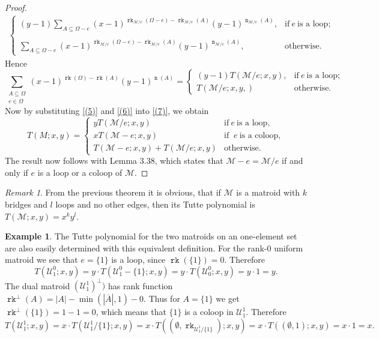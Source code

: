 \documentclass[12pt,a4paper, twoside, autooneside=false]{scrartcl}
\theoremstyle{definition}
\newtheorem{beispiel}[theorem]{Example}
\theoremstyle{remark}
\newtheorem{remark}[theorem]{Remark}
\numberwithin{equation}{section}
\DeclareMathOperator{\rk}{\mathtt{rk}}
\DeclareMathOperator{\n}{\mathtt{n}}
\newcommand{\M}{\mathcal{M}} %
\begin{document}
\begin{proof}
\begin{align*}
\begin{cases}
(y - 1) \sum\limits_{A \subseteq \Omega - e} (x - 1)^{\rk_{\M / e}(\Omega - e) - \rk_{\M / e}(A)} (y - 1)^{\n_{\M / e}(A)}, & \text{if} \ e \ \text{is a loop}; \\
& \\ 
\sum\limits_{A \subseteq \Omega - e} (x - 1)^{\rk_{\M / e }(\Omega - e) - \rk_{\M / e}(A)} (y - 1)^{\n_{\M / e}(A)}, & \text{otherwise}.
\end{cases}
\end{align*}
Hence 
\begin{equation} \label{(6)} 
\sum_{\substack{A \subseteq \Omega \\ e \in \Omega}} (x - 1)^{\rk(\Omega) - \rk(A)}(y - 1)^{\n(A)} = \begin{cases}
(y - 1)T(\M / e; x,y), & \text{if} \ e \ \text{is a loop}; \\
T(\M / e; x,y,) & \text{otherwise}.
\end{cases}
\end{equation}
Now by substituting \eqref{(5)} and \eqref{(6)} into \eqref{(7)}, we obtain 
\[
T(M; x,y) = \begin{cases}
y T(\M / e; x,y) & \text{if} \ e \ \text{is a loop}, \\
x T(\M - e; x,y) & \text{if } \ e \ \text{is a coloop}, \\
T(\M - e; x,y) + T(\M / e;x,y) & \text{otherwise}.
\end{cases}
\]
The result now follows with Lemma 3.38, which states that $\M - e = \M / e$ if and only if $e$ is a loop or a coloop of $\M$.
\end{proof}
\begin{remark}
From the previous theorem it is obvious, that if $\M$ is a matroid with $k$ bridges and $l$ loops and no other edges, then its Tutte polynomial is $T(\M;x,y) = x^ky^l$. 
\end{remark}
\begin{beispiel}
The Tutte polynomial for the two matroids on an one-element set are also easily determined with this equivalent definition. 
For the rank-$0$ uniform matroid we see that $e = \{1\}$ is a loop, since $\rk(\{1\}) = 0$. Therefore
\[
T(\mathcal{U}_1^0; x,y) = y \cdot T(\mathcal{U}_1^0 - \{1\}; x,y) 
= y \cdot T(\mathcal{U}_0^0; x,y) = y \cdot 1 = y.
\]
The dual matroid $(\mathcal{U}_1^1)^\perp)$ has rank function $\rk^\perp(A) = |A| - \min(|\overline{A}|, 1) - 0$. Thus for $A = \{1\}$ we get $\rk^\perp(\{1\}) = 1 - 1 = 0$, which means that $\{1\}$ is a coloop in $\mathcal{U}_1^1$. Therefore
\[
T(\mathcal{U}_1^1; x,y) = x \cdot T(\mathcal{U}_1^1 / \{1\}; x,y) 
= x \cdot T((\emptyset, \rk_{\mathcal{U}_1^1/ \{1\}});x,y) = x \cdot T((\emptyset,1);x,y)
= x \cdot 1 = x.
\]
\end{beispiel}
\end{document}
